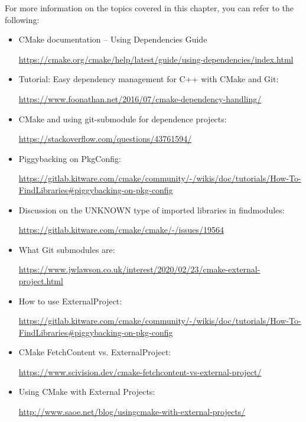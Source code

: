 For more information on the topics covered in this chapter, you can refer to the following:

\begin{itemize}
\item 
CMake documentation – Using Dependencies Guide

\url{https://cmake.org/cmake/help/latest/guide/using-dependencies/index.html}

\item 
Tutorial: Easy dependency management for C++ with CMake and Git: 

\url{https://www.foonathan.net/2016/07/cmake-dependency-handling/}

\item 
CMake and using git-submodule for dependence projects:

\url{ https://stackoverflow.com/questions/43761594/}


\item 
Piggybacking on PkgConfig: 

\url{https://gitlab.kitware.com/cmake/community/-/wikis/doc/tutorials/How-To-FindLibraries\#piggybacking-on-pkg-config}

\item 
Discussion on the UNKNOWN type of imported libraries in findmodules: 

\url{https://gitlab.kitware.com/cmake/cmake/-/issues/19564}

\item 
What Git submodules are: 

\url{https://www.jwlawson.co.uk/interest/2020/02/23/cmake-external-project.html}

\item 
How to use ExternalProject: 

\url{https://gitlab.kitware.com/cmake/community/-/wikis/doc/tutorials/How-To-FindLibraries\#piggybacking-on-pkg-config}


\item 
CMake FetchContent vs. ExternalProject: 

\url{ https://www.scivision.dev/cmake-fetchcontent-vs-external-project/}

\item 
Using CMake with External Projects:

\url{http://www.saoe.net/blog/usingcmake-with-external-projects/}
\end{itemize}